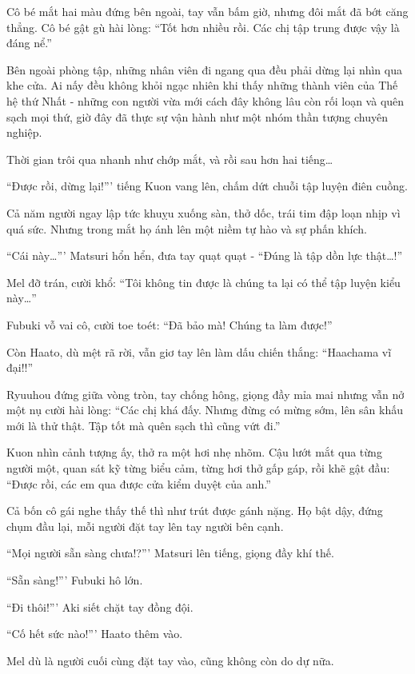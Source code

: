 \documentclass[../main.tex]{subfiles}
\begin{document}
Cô bé mắt hai màu đứng bên ngoài, tay vẫn bấm giờ, nhưng đôi mắt đã bớt căng thẳng. Cô bé gật gù hài lòng: ``Tốt hơn nhiều rồi. Các chị tập trung được vậy là đáng nể.''

Bên ngoài phòng tập, những nhân viên đi ngang qua đều phải dừng lại nhìn qua khe cửa. Ai nấy đều không khỏi ngạc nhiên khi thấy những thành viên của Thế hệ thứ Nhất - những con người vừa mới cách đây không lâu còn rối loạn và quên sạch mọi thứ, giờ đây đã thực sự vận hành như một nhóm thần tượng chuyên nghiệp.

Thời gian trôi qua nhanh như chớp mắt, và rồi sau hơn hai tiếng\dots

``Được rồi, dừng lại!''' tiếng Kuon vang lên, chấm dứt chuỗi tập luyện điên cuồng.

Cả năm người ngay lập tức khuỵu xuống sàn, thở dốc, trái tim đập loạn nhịp vì quá sức. Nhưng trong mắt họ ánh lên một niềm tự hào và sự phấn khích.

``Cái này\dots''' Matsuri hổn hển, đưa tay quạt quạt - ``Đúng là tập dồn lực thật\dots!''

Mel đỡ trán, cười khổ: ``Tôi không tin được là chúng ta lại có thể tập luyện kiểu này\dots''

Fubuki vỗ vai cô, cười toe toét: ``Đã bảo mà! Chúng ta làm được!''

Còn Haato, dù mệt rã rời, vẫn giơ tay lên làm dấu chiến thắng: ``Haachama vĩ đại!!''

Ryuuhou đứng giữa vòng tròn, tay chống hông, giọng đầy mỉa mai nhưng vẫn nở một nụ cười hài lòng: ``Các chị khá đấy. Nhưng đừng có mừng sớm, lên sân khấu mới là thử thật. Tập tốt mà quên sạch thì cũng vứt đi.''

Kuon nhìn cảnh tượng ấy, thở ra một hơi nhẹ nhõm. Cậu lướt mắt qua từng người một, quan sát kỹ từng biểu cảm, từng hơi thở gấp gáp, rồi khẽ gật đầu: ``Được rồi, các em qua được cửa kiểm duyệt của anh.''

Cả bốn cô gái nghe thấy thế thì như trút được gánh nặng. Họ bật dậy, đứng chụm đầu lại, mỗi người đặt tay lên tay người bên cạnh.


``Mọi người sẵn sàng chưa!?''' Matsuri lên tiếng, giọng đầy khí thế.

``Sẵn sàng!''' Fubuki hô lớn.

``Đi thôi!''' Aki siết chặt tay đồng đội.

``Cố hết sức nào!''' Haato thêm vào.

Mel dù là người cuối cùng đặt tay vào, cũng không còn do dự nữa.
\end{document}
